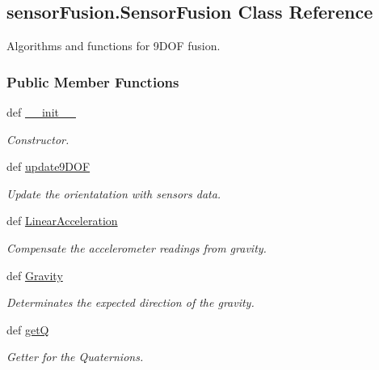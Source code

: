 \hypertarget{classsensor_fusion_1_1_sensor_fusion}{\subsection{sensor\-Fusion.\-Sensor\-Fusion Class Reference}
\label{classsensor_fusion_1_1_sensor_fusion}
}


Algorithms and functions for 9\-D\-O\-F fusion.  


\subsubsection*{Public Member Functions}
\begin{DoxyCompactItemize}
\item 
def \hyperlink{classsensor_fusion_1_1_sensor_fusion_a07d4323bb03221ed125f2766b026d0bb}{\-\_\-\-\_\-init\-\_\-\-\_\-}
\begin{DoxyCompactList}\small\item\em Constructor. \end{DoxyCompactList}\item 
def \hyperlink{classsensor_fusion_1_1_sensor_fusion_aaadc9cbd456803c6653038ac12657e52}{update9\-D\-O\-F}
\begin{DoxyCompactList}\small\item\em Update the orientatation with sensors data. \end{DoxyCompactList}\item 
def \hyperlink{classsensor_fusion_1_1_sensor_fusion_a1cfe19598a533cf05663860f7ea781e1}{Linear\-Acceleration}
\begin{DoxyCompactList}\small\item\em Compensate the accelerometer readings from gravity. \end{DoxyCompactList}\item 
def \hyperlink{classsensor_fusion_1_1_sensor_fusion_a9f3c9bded04e29005b165c31a2f0a223}{Gravity}
\begin{DoxyCompactList}\small\item\em Determinates the expected direction of the gravity. \end{DoxyCompactList}\item 
def \hyperlink{classsensor_fusion_1_1_sensor_fusion_ac8206f38acbae0e1ec5efe760a68e3f2}{get\-Q}
\begin{DoxyCompactList}\small\item\em Getter for the Quaternions. \end{DoxyCompactList}\item 

\end{DoxyCompactItemize}
